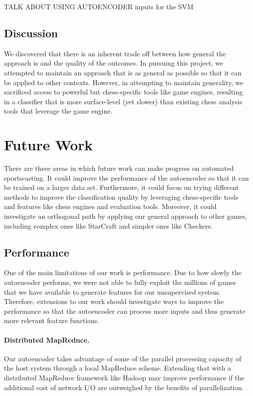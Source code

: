 \documentclass[11pt]{article}
\begin{document}
TALK ABOUT USING AUTOENCODER inputs for the SVM

\subsection{Discussion}
We discovered that there is an inherent trade off between how general the approach is and the quality of the outcomes. In pursuing this project, we attempted to maintain an approach that is as general as possible so that it can be applied to other contexts. However, in attempting to maintain generality, we sacrificed access to powerful but chess-specific tools like game engines, resulting in a classifier that is more surface-level (yet slower) than existing chess analysis tools that leverage the game engine. 

\section{Future Work}
There are three areas in which future work can make progress on automated sportscasting. It could improve the performance of the autoencoder so that it can be trained on a larger data set. Furthermore, it could focus on trying different methods to improve the classification quality by leveraging chess-specific tools and features like chess engines and evaluation tools. Moreover, it could investigate an orthogonal path by applying our general approach to other games, including complex ones like StarCraft and simpler ones like Checkers.

\subsection{Performance}
One of the main limitations of our work is performance. Due to how slowly the autoencoder performs, we were not able to fully exploit the millions of games that we have available to generate features for our unsupervised system. Therefore, extensions to our work should investigate ways to improve the performance so that the autoencoder can process more inputs and thus generate more relevant feature functions.

\paragraph{Distributed MapReduce.}
Our autoencoder takes advantage of some of the parallel processing capacity of the host system through a local MapReduce scheme. Extending that with a distributed MapReduce framework like Hadoop may improve performance if the additional cost of network I/O are outweighed by the benefits of parallelization.
\end{document}
